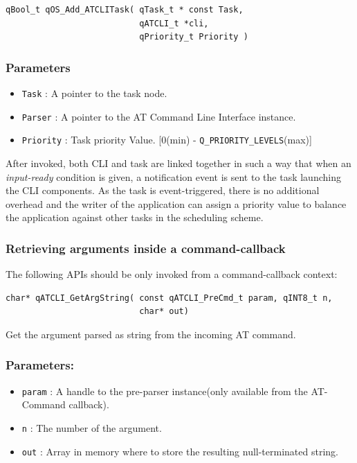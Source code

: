 \documentclass{article}
\begin{document}
\begin{lstlisting}[style=CStyle]
qBool_t qOS_Add_ATCLITask( qTask_t * const Task, 
                           qATCLI_t *cli, 
                           qPriority_t Priority )
\end{lstlisting}

\subsubsection*{Parameters}
\begin{itemize}
    \item \lstinline{Task} : A pointer to the task node. 
    \item \lstinline{Parser} :  A pointer to the AT Command Line Interface instance.
    \item \lstinline{Priority} : Task priority Value. [0(min) - \lstinline{Q_PRIORITY_LEVELS}(max)]
\end{itemize}

After invoked, both CLI and task are linked together in such a way that when an \textit{input-ready} condition is given, a notification event is sent to the task launching the CLI components. As the task is event-triggered, there is no additional overhead and the writer of the application can assign a priority value to balance the application against other tasks in the scheduling scheme.

\subsubsection{Retrieving arguments inside a command-callback}

The following APIs should be only invoked from a command-callback context: \\

\begin{lstlisting}[style=CStyle]
char* qATCLI_GetArgString( const qATCLI_PreCmd_t param, qINT8_t n,
                           char* out)
\end{lstlisting}

Get the argument parsed as string from the incoming AT command. 

\subsubsection*{Parameters:}
\begin{itemize}
    \item \lstinline{param} : A handle to the pre-parser instance(only available from the AT-Command callback).
    \item \lstinline{n} : The number of the argument.
    \item \lstinline{out} :  Array in memory where to store the resulting null-terminated string.
\end{itemize}
\end{document}
